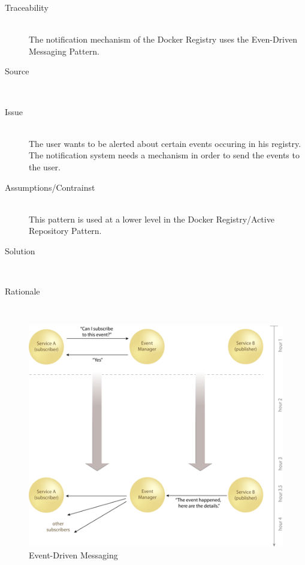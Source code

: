 \begin{description}

\item[Traceability]~\\
The notification mechanism of the Docker Registry uses the Even-Driven Messaging Pattern.

\item[Source]~\\

\item[Issue]~\\ The user wants to be alerted about certain events occuring in his registry.
The notification system needs a mechanism in order to send the events to the user.

\item[Assumptions/Contrainst]~\\ This pattern is used at a lower level in the Docker Registry/Active Repository Pattern.

\item[Solution]~\\

\item[Rationale]~\\ 

\end{description}

\begin{figure}[H]
\centering
\includegraphics{images/EDM.png}
\caption{Event-Driven Messaging}
\label{fig:event-driven}
\end{figure}

